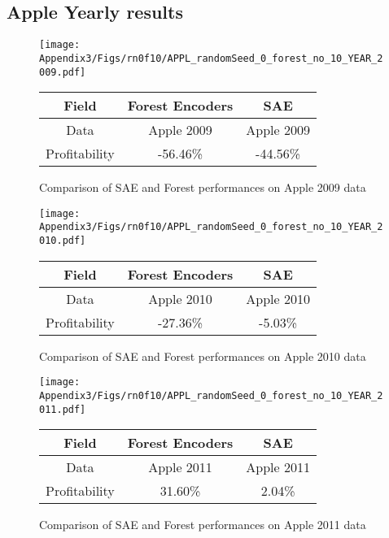 \subsection*{Apple Yearly results}
\begin{figure}[!htb]
    \centering
    \texttt{[image: Appendix3/Figs/rn0f10/APPL\_randomSeed\_0\_forest\_no\_10\_YEAR\_2009.pdf]}
    \qquad
    \begin{tabular}[b]{|c|c|c|}\hline
      Field & Forest Encoders & SAE \\ \hline
      Data & Apple 2009 & Apple 2009 \\ \hline
      Profitability & -56.46\% & -44.56\% \\ \hline
    \end{tabular}
    \captionsetup{labelformat=andtable}
    \caption{Comparison of SAE and Forest performances on Apple 2009 data}
\end{figure}
\newpage
\begin{figure}[!htb]
    \centering
    \texttt{[image: Appendix3/Figs/rn0f10/APPL\_randomSeed\_0\_forest\_no\_10\_YEAR\_2010.pdf]}
    \qquad
    \begin{tabular}[b]{|c|c|c|}\hline
      Field & Forest Encoders & SAE \\ \hline
      Data & Apple 2010 & Apple 2010 \\ \hline
      Profitability & -27.36\% & -5.03\% \\ \hline
    \end{tabular}
    \captionsetup{labelformat=andtable}
    \caption{Comparison of SAE and Forest performances on Apple 2010 data}
\end{figure}
\newpage
\begin{figure}[!htb]
    \centering
    \texttt{[image: Appendix3/Figs/rn0f10/APPL\_randomSeed\_0\_forest\_no\_10\_YEAR\_2011.pdf]}
    \qquad
    \begin{tabular}[b]{|c|c|c|}\hline
      Field & Forest Encoders & SAE \\ \hline
      Data & Apple 2011 & Apple 2011 \\ \hline
      Profitability & 31.60\% & 2.04\% \\ \hline
    \end{tabular}
    \captionsetup{labelformat=andtable}
    \caption{Comparison of SAE and Forest performances on Apple 2011 data}
\end{figure}
